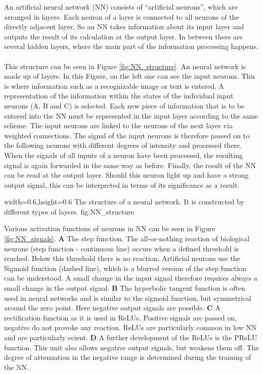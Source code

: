 An artificial neural network (NN) consists of \enquote{artificial neurons}, which are arranged in layers. Each neuron of a layer is connected to all neurons of the directly adjacent layer. So an NN takes information about its input layer and outputs the result of its calculation at the output layer. In between there are several hidden layers, where the main part of the information processing happens. \\
\\
This structure can be seen in Figure \ref{fig:NN_structure}. An neural network is made up of layers. In this Figure, on the left one can see the input neurons. This is where information such as a recognizable image or text is entered. A representation of the information within the states of the individual input neurons (A, B and C) is selected. Each new piece of information that is to be entered into the NN must be represented in the input layer according to the same scheme. The input neurons are linked to the neurons of the next layer via weighted connections. The signal of the input neurons is therefore passed on to the following neurons with different degrees of intensity and processed there. When the signals of all inputs of a neuron have been processed, the resulting signal is again forwarded in the same way as before. Finally, the result of the NN can be read at the output layer. Should this neuron light up and have a strong output signal, this can be interpreted in terms of its significance as a result. \cite{ZesarBewusstsein}

  {width=0.6\textwidth,height=0.6\textheight}%
  {The structure of a neural network. It is constructed by different types of layers. \cite{ZesarBewusstsein} }%
  {}%
  {fig:NN_structure}%
  
  

Various activation functions of neurons in NN can be seen in Figure \ref{fig:NN_signals}. \textbf{A} The step function. The all-or-nothing reaction of biological neurons (step function - continuous line) occurs when a defined threshold is reached. Below this threshold there is no reaction. Artificial neurons use the Sigmoid function (dashed line), which is a blurred version of the step function can be understood. A small change in the input signal therefore requires always a small change in the output signal. \textbf{B} The hyperbolic tangent function is often used in neural networks and is similar to the sigmoid function, but symmetrical around the zero point. Here negative output signals are possible. \textbf{C} A rectification function as it is used in ReLUs. Positive signals are passed on, negative do not provoke any reaction. ReLUs are particularly common in low NN and are particularly ecient. \textbf{D} A further development of the ReLUs is the PReLU function. This unit also allows negative output signals, but weakens them off. The degree of attenuation in the negative range is determined during the training of the NN. 
\cite{ZesarBewusstsein}

